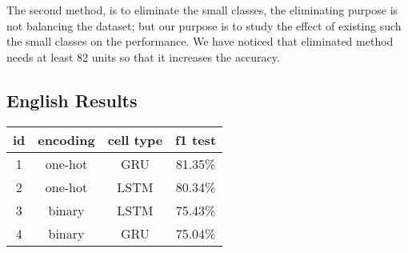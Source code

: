   
The second method, is to eliminate the small classes, the eliminating purpose is
not balancing the dataset; but our purpose is to study the effect of existing
such the small classes on the performance. We have noticed that eliminated
method needs at least 82 units so that it increases the accuracy.











\subsection{English Results}
\begin{center}
 \begin{tabular}{c c c c} 
     \toprule
     \textbf{id} & \textbf{encoding } & \textbf{cell type} & \textbf{f1 test}\\
     \midrule
     1 & one-hot & GRU  & 81.35\%\\ %
     2 & one-hot & LSTM & 80.34\%\\ %
     3 & binary  & LSTM & 75.43\%\\ %
     4 & binary  & GRU  & 75.04\%\\ %

     \bottomrule
 \end{tabular}
\label{eng-results}
\end{center}

